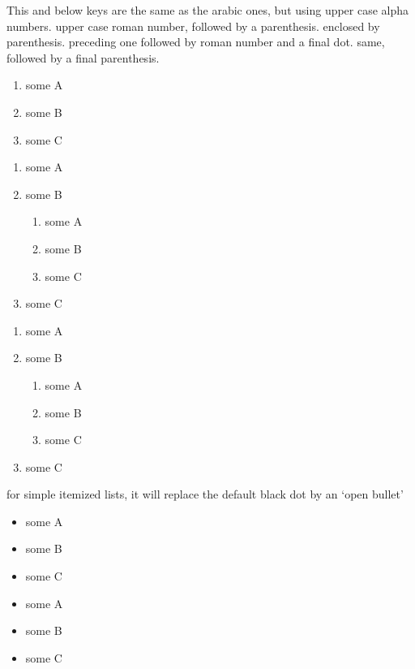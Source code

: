 \documentclass[dctools,english]{ufrgscca} %
\begin{document}
\begin{Keys}
	 This and below keys are the same as the arabic ones, but using upper case alpha numbers.
	 upper case roman number, followed by a parenthesis.
	 enclosed by parenthesis.
	 preceding one followed by roman number and a final dot.
	 same, followed by a final parenthesis.
	\begin{stcode}[st=enumC]
	\begin{enumerate}
		\item some A
		\item some B
		\item some C
	\end{enumerate}
	\begin{enumerate}
		\item some A
		\item some B
		\begin{enumerate}
			\item some A
			\item some B
			\item some C
		\end{enumerate}
		\item some C
	\end{enumerate}
	\begin{enumerate}
		\item some A
		\item some B
		\begin{enumerate}
			\item some A
			\item some B
			\item some C
		\end{enumerate}
		\item some C
	\end{enumerate}
\end{stcode}


	 for simple itemized lists, it will replace the default black dot by an `open bullet'
	\begin{stcode}[st=enumD]
	\begin{itemize}[tcc,miditemsep]
		\item some A
		\item some B
		\item some C
	\end{itemize}
	\begin{itemize}[tcc,bullet,miditemsep]
		\item some A
		\item some B
		\item some C
	\end{itemize}
\end{stcode}



\end{Keys}
\end{document}
